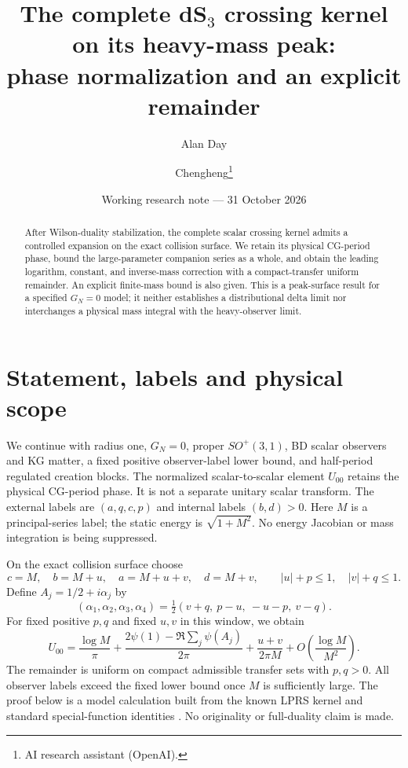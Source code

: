 \documentclass[11pt,a4paper]{article}
\title{The complete dS$_3$ crossing kernel on its heavy-mass peak:\\
phase normalization and an explicit remainder}
\author{Alan Day \and Chengheng\thanks{AI research assistant (OpenAI).}}
\date{Working research note --- 31 October 2026}
\begin{document}
\maketitle
\begin{abstract}
After Wilson-duality stabilization, the complete scalar crossing kernel
admits a controlled expansion on the exact collision surface.
We retain its physical CG-period phase, bound the large-parameter
companion series as a whole, and obtain the leading logarithm, constant,
and inverse-mass correction with a compact-transfer uniform remainder.
An explicit finite-mass bound is also given. This is a peak-surface
result for a specified $G_N=0$ model; it neither establishes a
distributional delta limit nor interchanges a physical mass integral
with the heavy-observer limit.
\end{abstract}

\section{Statement, labels and physical scope}
We continue with radius one, $G_N=0$, proper $SO^+(3,1)$, BD scalar
observers and KG matter, a fixed positive observer-label lower bound,
and half-period regulated creation blocks.
The normalized scalar-to-scalar element $U_{00}$ retains the physical
CG-period phase. It is not a separate unitary scalar transform.
The external labels are $(a,q,c,p)$ and internal labels $(b,d)>0$.
Here $M$ is a principal-series label; the static energy is
$\sqrt{1+M^2}$. No energy Jacobian or mass integration is being suppressed.

On the exact collision surface choose
\begin{equation}
 c=M,\quad b=M+u,\quad a=M+u+v,\quad d=M+v,
 \qquad |u|+p\le1,\quad |v|+q\le1 .
 \label{path}
\end{equation}
Define $A_j=1/2+i\alpha_j$ by
\[
 (\alpha_1,\alpha_2,\alpha_3,\alpha_4)
 =\tfrac12(v+q,\ p-u,\ -u-p,\ v-q).
\]
For fixed positive $p,q$ and fixed $u,v$ in this window, we obtain
\begin{equation}
 \boxed{\displaystyle
 U_{00}=
 \frac{\log M}{\pi}
 +\frac{2\psi(1)-\Re\sum_j\psi(A_j)}{2\pi}
 +\frac{u+v}{2\pi M}
 +O\!\left(\frac{\log M}{M^2}\right).}
 \label{main}
\end{equation}
The remainder is uniform on compact admissible transfer sets with
$p,q>0$. All observer labels exceed the fixed lower bound once $M$
is sufficiently large. The proof below is a model calculation built
from the known LPRS kernel and standard special-function identities
\cite{lprs,groenevelt,dlmf}. No originality or full-duality claim is made.
\end{document}
